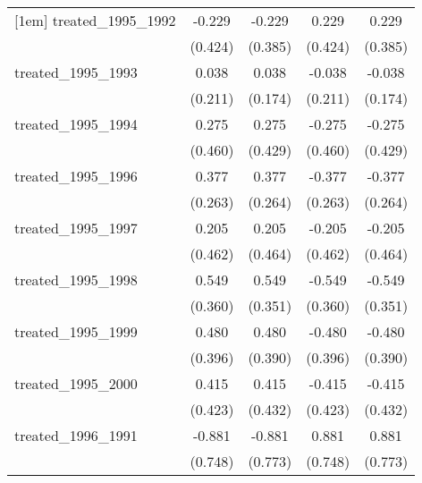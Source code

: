 {\begin{tabular}{l*{4}{c}}
[1em]
treated\_1995\_1992&      -0.229         &      -0.229         &       0.229         &       0.229         \\
            &     (0.424)         &     (0.385)         &     (0.424)         &     (0.385)         \\
[1em]
treated\_1995\_1993&       0.038         &       0.038         &      -0.038         &      -0.038         \\
            &     (0.211)         &     (0.174)         &     (0.211)         &     (0.174)         \\
[1em]
treated\_1995\_1994&       0.275         &       0.275         &      -0.275         &      -0.275         \\
            &     (0.460)         &     (0.429)         &     (0.460)         &     (0.429)         \\
[1em]
treated\_1995\_1996&       0.377         &       0.377         &      -0.377         &      -0.377         \\
            &     (0.263)         &     (0.264)         &     (0.263)         &     (0.264)         \\
[1em]
treated\_1995\_1997&       0.205         &       0.205         &      -0.205         &      -0.205         \\
            &     (0.462)         &     (0.464)         &     (0.462)         &     (0.464)         \\
[1em]
treated\_1995\_1998&       0.549         &       0.549         &      -0.549         &      -0.549         \\
            &     (0.360)         &     (0.351)         &     (0.360)         &     (0.351)         \\
[1em]
treated\_1995\_1999&       0.480         &       0.480         &      -0.480         &      -0.480         \\
            &     (0.396)         &     (0.390)         &     (0.396)         &     (0.390)         \\
[1em]
treated\_1995\_2000&       0.415         &       0.415         &      -0.415         &      -0.415         \\
            &     (0.423)         &     (0.432)         &     (0.423)         &     (0.432)         \\
[1em]
treated\_1996\_1991&      -0.881         &      -0.881         &       0.881         &       0.881         \\
            &     (0.748)         &     (0.773)         &     (0.748)         &     (0.773)         \\

\end{tabular}}

